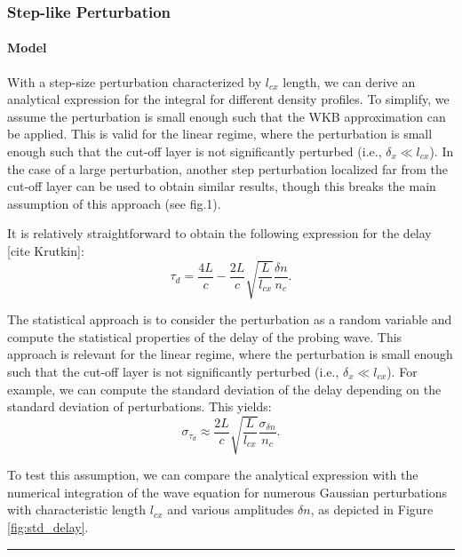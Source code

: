 \documentclass[11pt,a4paper,openany]{report}
\begin{document}
\begin{multicols}{2}
    \subsubsection{Step-like Perturbation}
    \paragraph*{Model}
    With a step-size perturbation characterized by $l_{cx}$ length, we can derive an analytical expression for the integral for different density profiles. To simplify, we assume the perturbation is small enough such that the WKB approximation can be applied. This is valid for the linear regime, where the perturbation is small enough such that the cut-off layer is not significantly perturbed (i.e., $\delta_x \ll l_{cx}$). In the case of a large perturbation, another step perturbation localized far from the cut-off layer can be used to obtain similar results, though this breaks the main assumption of this approach (see fig.1).

    It is relatively straightforward to obtain the following expression for the delay [cite Krutkin]:
    $$\tau_d = \frac{4L}{c} - \frac{2L}{c} \sqrt{\frac{L}{l_{cx}}} \frac{\delta n}{n_c}.$$

    The statistical approach is to consider the perturbation as a random variable and compute the statistical properties of the delay of the probing wave. This approach is relevant for the linear regime, where the perturbation is small enough such that the cut-off layer is not significantly perturbed (i.e., $\delta_x \ll l_{cx}$). For example, we can compute the standard deviation of the delay depending on the standard deviation of perturbations. This yields:
    $$\sigma_{\tau_d} \approx \frac{2L}{c} \sqrt{\frac{L}{l_{cx}}} \frac{\sigma_{\delta n}}{n_c}.$$

    To test this assumption, we can compare the analytical expression with the numerical integration of the wave equation for numerous Gaussian perturbations with characteristic length $l_{cx}$ and various amplitudes $\delta n$, as depicted in Figure \ref{fig:std_delay}.
\end{multicols}
\noindent
\rule{\linewidth}{0.4pt}
\end{document}
